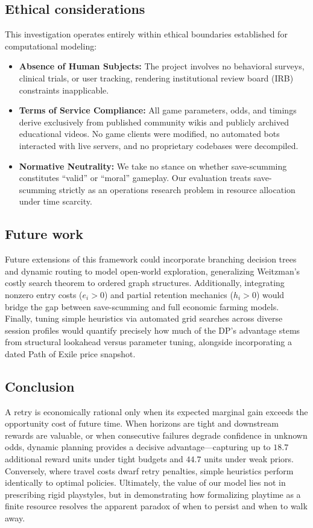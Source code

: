 \documentclass[11pt,a4paper]{article}
\begin{document}
\subsection{Ethical considerations}
This investigation operates entirely within ethical boundaries established for computational modeling:
\begin{itemize}
\item \textbf{Absence of Human Subjects:} The project involves no behavioral surveys, clinical trials, or user tracking, rendering institutional review board (IRB) constraints inapplicable.
\item \textbf{Terms of Service Compliance:} All game parameters, odds, and timings derive exclusively from published community wikis and publicly archived educational videos. No game clients were modified, no automated bots interacted with live servers, and no proprietary codebases were decompiled.
\item \textbf{Normative Neutrality:} We take no stance on whether save-scumming constitutes ``valid'' or ``moral'' gameplay. Our evaluation treats save-scumming strictly as an operations research problem in resource allocation under time scarcity.
\end{itemize}

\subsection{Future work}
Future extensions of this framework could incorporate branching decision trees and dynamic routing to model open-world exploration, generalizing Weitzman's costly search theorem to ordered graph structures. Additionally, integrating nonzero entry costs ($e_i > 0$) and partial retention mechanics ($h_i > 0$) would bridge the gap between save-scumming and full economic farming models. Finally, tuning simple heuristics via automated grid searches across diverse session profiles would quantify precisely how much of the DP's advantage stems from structural lookahead versus parameter tuning, alongside incorporating a dated Path of Exile price snapshot.

\subsection{Conclusion}
A retry is economically rational only when its expected marginal gain exceeds the opportunity cost of future time. When horizons are tight and downstream rewards are valuable, or when consecutive failures degrade confidence in unknown odds, dynamic planning provides a decisive advantage—capturing up to $18.7$ additional reward units under tight budgets and $44.7$ units under weak priors. Conversely, where travel costs dwarf retry penalties, simple heuristics perform identically to optimal policies. Ultimately, the value of our model lies not in prescribing rigid playstyles, but in demonstrating how formalizing playtime as a finite resource resolves the apparent paradox of when to persist and when to walk away.
\end{document}

